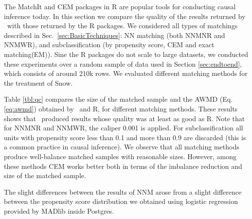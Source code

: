 
The MatchIt and CEM packages in R are popular tools for conducting
causal inference today.  In this section we compare the quality of the
results returned by \GSQL\ with those returned by the R packages.  We
considered all types of matchings described in
Sec.~\ref{sec:BasicTechniques}: NN matching (both NNMNR and NNMWR),
and subclassification (by propensity score, CEM and exact matching(EM)).  Sine the R
packages do not scale to large datasets, we conducted these
experiments over a random sample of data used in Section
\ref{sec:endtoend}, which consists of around 210k rows. We evaluated
different matching methods for the treatment of Snow.


Table \ref{tbl:qc} compares the size of the matched sample and the
AWMD (Eq.\ref{eq:awmd}) obtained by \GSQL \ and R, for different
matching methods.  These results shows that \GSQL\ produced results
whose quality was at least as good as R.  Note that for NNMNR and
NNMWR, the caliper 0.001 is applied.   For subclassification all units with
propensity score less than 0.1 and more than 0.9 are discarded (this
is a common practice in causal inference). We observe that all
matching methods produce well-balance matched samples with reasonable
sizes. However, among these methods CEM works better both in terms of
the imbalance reduction and size of the matched sample.

The slight differences between
the results of NNM arose from a slight
difference between the propensity score distribution we obtained using logistic regression provided by MADlib inside Postgres. 







